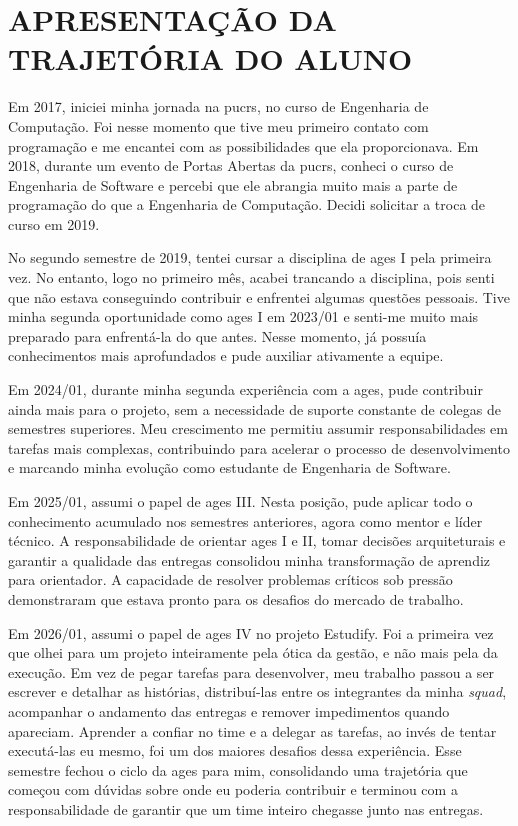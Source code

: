 \chapter[APRESENTAÇÃO DA TRAJETÓRIA DO ALUNO]{APRESENTAÇÃO DA TRAJETÓRIA DO ALUNO}

Em 2017, iniciei minha jornada na \ac{pucrs}, no curso de Engenharia de Computação. Foi nesse momento que tive meu primeiro contato com programação e me encantei com as possibilidades que ela proporcionava. Em 2018, durante um evento de Portas Abertas da \ac{pucrs}, conheci o curso de Engenharia de Software e percebi que ele abrangia muito mais a parte de programação do que a Engenharia de Computação. Decidi solicitar a troca de curso em 2019.

No segundo semestre de 2019, tentei cursar a disciplina de \ac{ages} I pela primeira vez. No entanto, logo no primeiro mês, acabei trancando a disciplina, pois senti que não estava conseguindo contribuir e enfrentei algumas questões pessoais. Tive minha segunda oportunidade como \ac{ages} I em 2023/01 e senti-me muito mais preparado para enfrentá-la do que antes. Nesse momento, já possuía conhecimentos mais aprofundados e pude auxiliar ativamente a equipe.

Em 2024/01, durante minha segunda experiência com a \ac{ages}, pude contribuir ainda mais para o projeto, sem a necessidade de suporte constante de colegas de semestres superiores. Meu crescimento me permitiu assumir responsabilidades em tarefas mais complexas, contribuindo para acelerar o processo de desenvolvimento e marcando minha evolução como estudante de Engenharia de Software.

Em 2025/01, assumi o papel de \ac{ages} III. Nesta posição, pude aplicar todo o conhecimento acumulado nos semestres anteriores, agora como mentor e líder técnico. A responsabilidade de orientar \ac{ages} I e II, tomar decisões arquiteturais e garantir a qualidade das entregas consolidou minha transformação de aprendiz para orientador. A capacidade de resolver problemas críticos sob pressão demonstraram que estava pronto para os desafios do mercado de trabalho.

Em 2026/01, assumi o papel de \ac{ages} IV no projeto Estudify. Foi a primeira vez que olhei para um projeto inteiramente pela ótica da gestão, e não mais pela da execução. Em vez de pegar tarefas para desenvolver, meu trabalho passou a ser escrever e detalhar as histórias, distribuí-las entre os integrantes da minha \textit{squad}, acompanhar o andamento das entregas e remover impedimentos quando apareciam. Aprender a confiar no time e a delegar as tarefas, ao invés de tentar executá-las eu mesmo, foi um dos maiores desafios dessa experiência. Esse semestre fechou o ciclo da \ac{ages} para mim, consolidando uma trajetória que começou com dúvidas sobre onde eu poderia contribuir e terminou com a responsabilidade de garantir que um time inteiro chegasse junto nas entregas.

